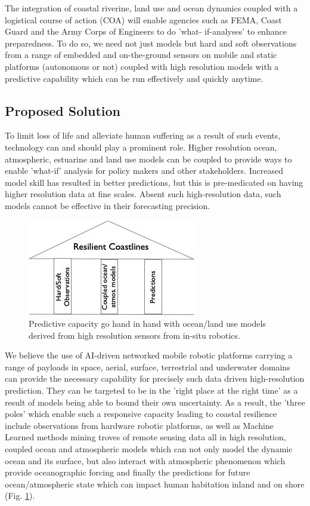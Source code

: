 The integration of coastal riverine, land use and ocean dynamics
coupled with a logistical course of action (COA) will enable agencies
such as FEMA, Coast Guard and the Army Corps of Engineers to do ’what-
if-analyses’ to enhance preparedness. To do so, we need not just
models but hard and soft observations from a range of embedded and
on-the-ground sensors on mobile and static platforms (autonomous or
not) coupled with high resolution models with a predictive capability
which can be run effectively and quickly anytime.

\subsection*{Proposed Solution}

To limit loss of life and alleviate human suffering as a result of
such events, technology can and should play a prominent role. Higher
resolution ocean, atmospheric, estuarine and land use models can be
coupled to provide ways to enable 'what-if' analysis for policy makers
and other stakeholders. Increased model skill has resulted in better
predictions, but this is pre-medicated on having higher resolution
data at fine scales. Absent such high-resolution data, such models
cannot be effective in their forecasting precision. 

\begin{figure}
  \centering
  \includegraphics[scale=0.5]{fig/trioka.jpg}
  \caption{Predictive capacity go hand in hand with ocean/land use
    models derived from high resolution sensors from in-situ robotics.}
  \label{fig:tri}
\end{figure}

We believe the use of AI-driven networked mobile robotic platforms
carrying a range of payloads in space, aerial, surface, terrestrial
and underwater domains can provide the necessary capability for
precisely such data driven high-resolution prediction.%
They
can be targeted to be in the 'right place at the right time' as a
result of models being able to bound their own uncertainty. As a
result, the 'three poles' which enable such a responsive capacity
leading to coastal resilience include observations from hardware
robotic platforms, as well as Machine Learned methods mining troves of
remote sensing data all in high resolution, coupled ocean and
atmospheric models which can not only model the dynamic ocean and its
surface, but also interact with atmospheric phenomenon which provide
oceanographic forcing and finally the predictions for future
ocean/atmospheric state which can impact human habitation inland and
on shore (Fig. \ref{fig:tri}).

